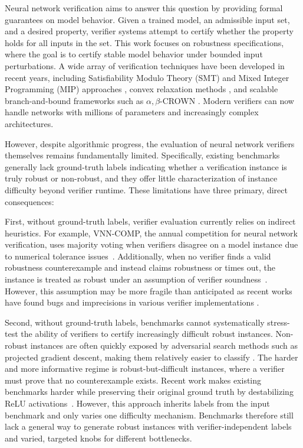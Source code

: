 \documentclass{article}
\theoremstyle{definition}
\begin{document}
Neural network verification aims to answer this question by providing formal guarantees on model behavior. Given a trained model, an admissible input set, and a desired property, verifier systems attempt to certify whether the property holds for all inputs in the set. 
This work focuses on robustness specifications, where the goal is to certify stable model behavior under bounded input perturbations. 
A wide array of verification techniques have been developed in recent years, including Satisfiability Modulo Theory (SMT) and Mixed Integer Programming (MIP) approaches \citep{katz2017reluplex, tjeng2017evaluating}, convex relaxation methods \citep{wong2018scaling}, and scalable branch-and-bound frameworks such as $\alpha,\beta$-CROWN \citep{wang2021betacrownefficientboundpropagation, xu2020automatic}. 
Modern verifiers can now handle networks with millions of parameters and increasingly complex architectures. 

However, despite algorithmic progress, the evaluation of neural network verifiers themselves remains fundamentally limited. Specifically, existing benchmarks generally lack ground-truth labels indicating whether a verification instance is truly robust or non-robust, and they offer little characterization of instance difficulty beyond verifier runtime. These limitations have three primary, direct consequences: 

First, without ground-truth labels, verifier evaluation currently relies on indirect heuristics. For example, VNN-COMP, the annual competition for neural network verification, uses majority voting when verifiers disagree on %
a model instance due to numerical tolerance issues~\citep{kaulen20256th}. Additionally, when no verifier finds a valid robustness counterexample and instead claims robustness or times out, the instance is treated as robust under an assumption of verifier soundness~\citep{kaulen20256th}. 
However, this assumption may be more fragile than anticipated as recent works have found bugs and imprecisions in various verifier implementations \citep{zhou2024soundnessbench,DBLP:journals/corr/abs-2003-03021,zombori2021fooling}. 

Second, without ground-truth labels, benchmarks cannot systematically stress-test the ability of verifiers to certify increasingly difficult robust instances. Non-robust instances are often quickly exposed by adversarial search methods such as projected gradient descent, making them relatively easier to classify \cite{madry2019deeplearningmodelsresistant}. The harder and more informative regime is robust-but-difficult instances, where a verifier must prove that no counterexample exists. Recent work makes existing benchmarks harder while preserving their original ground truth by destabilizing ReLU activations~\citep{relusplitter}. However, this approach inherits labels from the input benchmark and only varies one difficulty mechanism. Benchmarks therefore still lack a general way to generate robust instances with verifier-independent labels and varied, targeted knobs for different bottlenecks.
\end{document}
